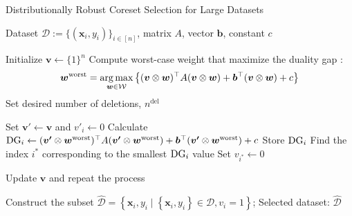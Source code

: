 %
\begin{algorithm}[H]
  \renewcommand{\algorithmicrequire}{\textbf{Input:}}
  \renewcommand{\algorithmicensure}{\textbf{Output:}}
  \caption{Distributionally Robust Coreset Selection for Large Datasets}
  \label{alg:2}
  \begin{algorithmic}[1]
      \Require Dataset ${\mathcal D} := \{(\bm x_i, y_i)\}_{i \in [n]}$, matrix $A$, vector $\bm b$, constant $c$

      \State Initialize $\boldsymbol{v} \gets \{1\}^n$
      \State Compute worst-case weight that maximize the duality gap :
      \[
      \bm w^{\mathrm{worst}} = \operatorname*{arg\,max}_{\boldsymbol{w} \in \mathcal{W}} \left\{(\boldsymbol{v} \otimes \boldsymbol{w})^\top A (\boldsymbol{v} \otimes \boldsymbol{w}) + \bm b^\top (\boldsymbol{v} \otimes \boldsymbol{w}) + c\right\}
      \]
      \State Set desired number of deletions, $n^\mathrm{del}$

              \State Set $\boldsymbol{v'} \gets \boldsymbol{v}$ and $v'_i \gets 0$ 
              \State Calculate ${\rm DG}_i \gets (\boldsymbol{v'} \otimes \boldsymbol{w}^{\mathrm{worst}})^\top A (\boldsymbol{v'} \otimes \boldsymbol{w}^{\mathrm{worst}}) + \bm b^\top (\boldsymbol{v'} \otimes \boldsymbol{w}^{\mathrm{worst}}) + c$
              \State Store ${\rm DG}_i$
          \EndFor
          \State Find the index $i^*$ corresponding to the smallest ${\rm DG}_i$ value
          \State Set $v_{i^*} \gets 0$ 

          \State Update $\boldsymbol{v}$ and repeat the process
      \EndWhile

      \State Construct the subset $\hat{\mathcal{D}}=\left\{\bm x_{i}, y_i \mid \left\{\bm x_{i}, y_i\right\} \in \mathcal{D}, v_i=1\right\}$;
      \Ensure Selected dataset: $\hat{\mathcal{D}}$

  \end{algorithmic}
\end{algorithm}

